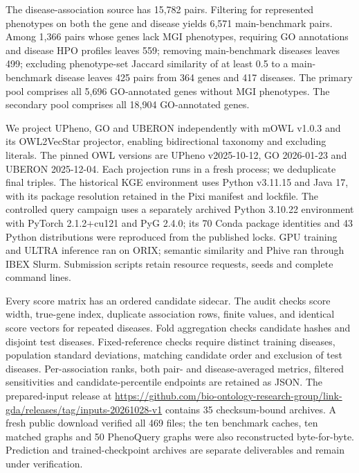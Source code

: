 \documentclass{article}
\begin{document}
The disease-association source has 15,782 pairs. Filtering for represented
phenotypes on both the gene and disease yields 6,571 main-benchmark pairs.
Among 1,366 pairs whose genes lack MGI phenotypes, requiring GO annotations
and disease HPO profiles leaves 559; removing main-benchmark diseases leaves
499; excluding phenotype-set Jaccard similarity of at least 0.5 to a
main-benchmark disease leaves 425 pairs from 364 genes and 417 diseases.
The primary pool comprises all 5,696 GO-annotated genes without MGI phenotypes.
The secondary pool comprises all 18,904 GO-annotated genes.

We project UPheno, GO and UBERON independently with mOWL v1.0.3 and its
OWL2VecStar projector, enabling bidirectional taxonomy and excluding literals.
The pinned OWL versions are UPheno v2025-10-12, GO 2026-01-23 and UBERON
2025-12-04. Each projection runs in a fresh process; we deduplicate final
triples. The historical KGE environment uses Python v3.11.15 and Java 17, with its
package resolution retained in the Pixi manifest and lockfile. The controlled
query campaign uses a separately archived Python 3.10.22 environment with
PyTorch 2.1.2+cu121 and PyG 2.4.0; its 70 Conda package identities and 43
Python distributions were reproduced from the published locks. GPU training and ULTRA inference ran on ORIX; semantic similarity
and Phive ran through IBEX Slurm. Submission scripts retain resource requests,
seeds and complete command lines.

Every score matrix has an ordered candidate sidecar. The audit checks score
width, true-gene index, duplicate association rows, finite values, and identical
score vectors for repeated diseases. Fold aggregation checks candidate hashes
and disjoint test diseases. Fixed-reference checks require distinct training
diseases, population standard deviations, matching candidate order and exclusion
of test diseases. Per-association ranks, both pair- and disease-averaged metrics,
filtered sensitivities and candidate-percentile endpoints are retained as JSON.
The prepared-input release at
\url{https://github.com/bio-ontology-research-group/link-gda/releases/tag/inputs-20261028-v1}
contains 35 checksum-bound archives. A fresh public download verified all 469
files; the ten benchmark caches, ten matched graphs and 50 PhenoQuery graphs
were also reconstructed byte-for-byte. Prediction and trained-checkpoint
archives are separate deliverables and remain under verification.


\end{document}
